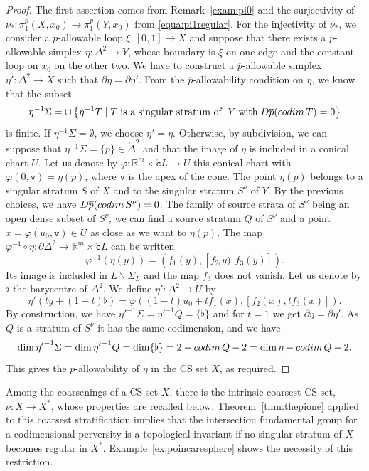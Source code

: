 \documentclass[a4paper,10pt,english,reqno]{amsart}
\theoremstyle{plain}
\theoremstyle{definition}
\theoremstyle{remark}
\numberwithin{equation}{section}
\newcommand{\thmref}[1]{Theorem~\ref{#1}}
\newcommand{\remref}[1]{Remark~\ref{#1}}
\newcommand{\exemref}[1]{Example~\ref{#1}}
\def\R{{\mathbb R}}
\def\ov{\overline}
\def\tc{{\mathtt c}}
\def\tv{{\mathtt v}}
\def\R{\mathbb{R}}
\def\codim{{\rm codim\,}}
\def\rc{{\mathring{\tc}}}
\def\menos{\backslash}
\newcommand{\inte}[1]{\mathring{#1}}
\renewcommand\1{\hbox{\ding{192}}}
\renewcommand\2{\hbox{\ding{193}}}
\newcommand\3{\hbox{\ding{194}}}
\newcommand\4{\hbox{\ding{195}}}
\begin{document}
\begin{proof}
%
The first assertion comes from \remref{exam:pi0}
and the surjectivity of $\nu_{*}\colon \pi_{1}^{\ov{p}}(X,x_{0})\to \pi_{1}^{\ov{p}}(Y,x_{0})$ from \eqref{equa:pi1regular}.
%
%
For the injectivity of $\nu_{*}$, we consider a $\ov{p}$-allowable loop $\xi\colon [0,1]\to X$ and suppose that there exists a 
$\ov{p}$-allowable simplex $\eta\colon \Delta^2\to Y$, 
whose boundary is $\xi$ on one edge and the constant 
loop on $x_{0}$ on the other two. 
%
%
We have to construct a  $\ov{p}$-allowable simplex
$\eta'\colon \Delta^2\to X$ such that $\partial \eta=\partial \eta'$.
%
From the $\ov{p}$-allowability condition on $\eta$, we know that the subset
$$\eta^{-1}\Sigma=
\cup\left\{ \eta^{-1}T\mid T \;\text{is a singular stratum of }\; Y \;\text{with} \;D\ov{p}(\codim T)=0\right\}$$
is finite. If $\eta^{-1}\Sigma=\emptyset$, we choose $\eta'=\eta$.
%
Otherwise, by subdivision, we can suppose that $\eta^{-1}\Sigma=\{p\}\in \inte\Delta^2$
and that the image of $\eta$ is included in a conical chart $U$. 
Let us denote by $\varphi\colon \R^m\times \rc L\to U$ this conical chart with $\varphi(0,\tv)=\eta(p)$,
where $\tv$ is the apex of the cone.
The point $\eta(p)$ belongs to a singular stratum $S$ of $X$ and to the singular stratum $S^\nu$ of $Y$.
By the previous  choices, we have $D\ov{p}(\codim S^\nu)=0$.
The family of source strata of $S^\nu$ being an open dense subset of $S^\nu$, we can find a source
stratum $Q$ of $S^\nu$ and a point $x=\varphi(u_{0},\tv)\in U$ as close as we want to $\eta(p)$.
The map $\varphi^{-1}\circ \eta\colon \partial \Delta^2\to \R^m\times \rc L$ can be written
$$\varphi^{-1}(\eta(y))=(f_{1}(y),[f_{2(}y),f_{3}(y)]).$$
Its image is included in $L\menos\Sigma_{L}$ and the map $f_{3}$ does not vanish.
Let us denote by $\flat$ the barycentre of $\Delta^2$.
We define $\eta'\colon \Delta^2\to U$ by
$$\eta'(ty+(1-t)\flat)=\varphi((1-t)u_{0}+tf_{1}(x),[f_{2}(x),tf_{3}(x)]).$$
By construction, we have
${\eta'}^{-1}\Sigma={\eta'}^{-1}Q=\{\flat\}$
and for $t=1$ we get $\partial\eta=\partial\eta'$.
As $Q$ is a stratum of $S^\nu$ it has the same codimension, and we have
$$\dim{\eta'}^{-1}\Sigma=\dim {\eta'}^{-1} Q=\dim \{\flat\}=
2-\codim Q-2=\dim \eta-\codim Q -2.
$$
This gives the $\ov{p}$-allowability of $\eta$ in the CS set $X$, as required.
%
\end{proof}



Among the coarsenings of a CS set $X$, there is the  intrinsic coarsest CS set, $\nu\colon X\to X^*$,
whose properties are recalled below. 
\thmref{thm:thepione} applied to this coarsest stratification  implies that the intersection
fundamental group for a codimensional perversity is a topological invariant if  no singular stratum of $X$ becomes regular in $X^*$. 
\exemref{ex:poincaresphere} shows the necessity of this restriction.
\end{document}
